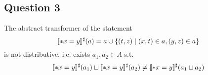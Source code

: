 \subsection{Question 3}
The abstract transformer of the statement
\begin{equation*}
	[\![*x=y]\!]^\sharp(a)=a\cup\{(t,z)\mid(x,t)\in a, (y,z)\in a\}
\end{equation*}
is not distributive, i.e. exists $a_1,a_2\in A$ s.t.
\begin{equation*} [\![*x=y]\!]^\sharp(a_1)\sqcup[\![*x=y]\!]^\sharp(a_2)\ne[\![*x=y]\!]^\sharp(a_1\sqcup a_2)
\end{equation*}